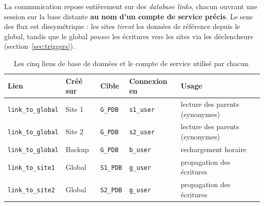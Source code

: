 \documentclass[11pt,a4paper]{article}
\begin{document}
La communication repose entièrement sur des \emph{database links}, chacun
ouvrant une session sur la base distante \textbf{au nom d'un compte de service
précis}. Le sens des flux est dissymétrique : les sites \emph{tirent} les
données de référence depuis le global, tandis que le global \emph{pousse} les
écritures vers les sites via les déclencheurs (section~\ref{sec:triggers}).

\begin{table}[h]
\centering
\begin{tabular}{@{}lllll@{}}
\toprule
\textbf{Lien} & \textbf{Créé sur} & \textbf{Cible} & \textbf{Connexion en} & \textbf{Usage} \\
\midrule
\texttt{link\_to\_global} & Site 1 & \texttt{G\_PDB}  & \texttt{s1\_user} & lecture des parents (synonymes) \\
\texttt{link\_to\_global} & Site 2 & \texttt{G\_PDB}  & \texttt{s2\_user} & lecture des parents (synonymes) \\
\texttt{link\_to\_global} & Backup & \texttt{G\_PDB}  & \texttt{b\_user}  & rechargement horaire \\
\texttt{link\_to\_site1}  & Global & \texttt{S1\_PDB} & \texttt{g\_user}  & propagation des écritures \\
\texttt{link\_to\_site2}  & Global & \texttt{S2\_PDB} & \texttt{g\_user}  & propagation des écritures \\
\bottomrule
\end{tabular}
\caption{Les cinq liens de base de données et le compte de service utilisé par
chacun.}
\label{tab:links}
\end{table}
\end{document}
